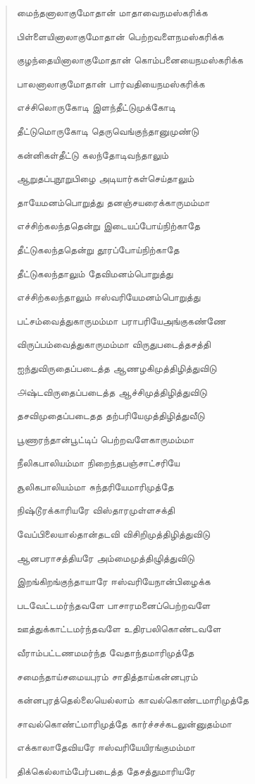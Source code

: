 \documentclass{article}
\begin{document}
\begin{quotation}
{மைந்தனாலாகுமோதான் மாதாவைநமஸ்கரிக்க

பிள்ளையினாலாகுமோதான் பெற்றவளைநமஸ்கரிக்க

குழந்தையினாலாகுமோதான்‌ கொம்பனையைநமஸ்கரிக்க

பாலனாலாகுமோதான்‌ பார்வதியைநமஸ்கரிக்க

எச்சிலொருகோடி இளந்தீட்டுமுக்கோடி

தீட்டுமொருகோடி தெருவெங்குந்தானுமுண்டு

கன்னிகள்தீட்டு கலந்தோடிவந்தாலும்

ஆறுதப்புநூறுபிழை அடியார்கள்செய்தாலும்

தாயேமனம்பொறுத்து தனஞ்சயரைக்காருமம்மா

எச்சிற்கலந்ததென்று இடையப்போய்நிற்காதே

தீட்டுகலந்ததென்று தூரப்போய்நிற்காதே

தீட்டுகலந்தாலும் தேவிமனம்பொறுத்து

எச்சிற்கலந்தாலும் ஈஸ்வரியேமனம்பொறுத்து

பட்சம்வைத்துகாருமம்மா பராபரியேஅங்குகண்ணே

விருப்பம்வைத்துகாருமம்மா விருதுபடைத்தசத்தி

ஐந்துவிருதைப்படைத்த ஆணழகிமுத்திழித்‌துவிடு

௮ஷ்டவிருதைப்படைத்த ஆச்சிமுத்திழித்‌துவிடு

தசவிமுதைப்படைதத தற்பரியேமுத்திழித்‌துவீடு

பூணாரந்தான்‌பூட்டிப்‌ பெற்றவளேகாருமம்மா

நீலிகபாலியம்மா நிறைந்தபஞ்சாட்சரியே

சூலிகபாலியம்மா சுந்தரியேமாரிமுத்தே

நிஷ்டூரக்காரியரே விஸ்தாரமுள்ளசக்தி

வேப்பிலையால்தான்தடவி விசிறிமுத்திழித்துவிடு

ஆனபராசத்தியரே அம்மைமுத்திழுித்துவிடு

இறங்கிறங்குந்தாயாரே ஈஸ்வரியேநான்பிழைக்க

படவேட்டமர்ந்தவளே பாசாரமனைப்பெற்றவளே

ஊத்துக்காட்டமர்ந்தவளே உதிரபலிகொண்டவளே

வீராம்பட்டணமமர்ந்த வேதாந்தமாரிமுத்தே

சமைந்தாய்சமையபுரம் சாதித்தாய்கன்னபுரம்

கன்னபுரத்தெல்லையெல்லாம் காவல்கொண்டமாரிமுத்தே

சாவல்கொண்ட்மாரிமுத்தே கார்ச்சச்கடலுன்னுதம்மா

எக்காலாதேவியரே ஈஸ்வரியேயிரங்குமம்மா

திக்கெல்லாம்பேர்படைத்த தேசத்துமாரியரே

}
\end{quotation}
\end{document}
